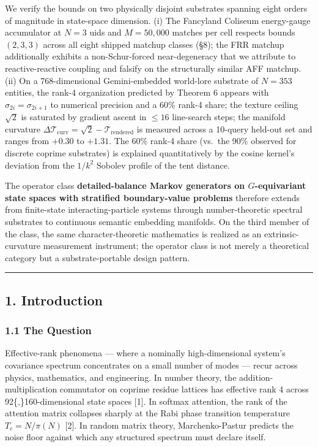 \documentclass[
  11pt,
]{article}
\begin{document}
We verify the bounds on two physically disjoint substrates spanning
eight orders of magnitude in state-space dimension. (i) The Fancyland
Coliseum energy-gauge accumulator at \(N = 3\) uids and \(M = 50{,}000\)
matches per cell respects bounds \((2, 3, 3)\) across all eight shipped
matchup classes (§8); the FRR matchup additionally exhibits a
non-Schur-forced near-degeneracy that we attribute to reactive-reactive
coupling and falsify on the structurally similar AFF matchup. (ii) On a
768-dimensional Gemini-embedded world-lore substrate of \(N = 353\)
entities, the rank-4 organization predicted by Theorem 6 appears with
\(\sigma_{2i} = \sigma_{2i+1}\) to numerical precision and a 60\% rank-4
share; the texture ceiling \(\sqrt{2}\) is saturated by gradient ascent
in \(\leq 16\) line-search steps; the manifold curvature
\(\Delta\mathcal{T}_\text{curv} = \sqrt{2} - \mathcal{T}_\text{rendered}\)
is measured across a 10-query held-out set and ranges from \(+0.30\) to
\(+1.31\). The 60\% rank-4 share (vs.~the 90\% observed for discrete
coprime substrates) is explained quantitatively by the cosine kernel's
deviation from the \(1/k^2\) Sobolev profile of the tent distance.

The operator class \textbf{detailed-balance Markov generators on
\(G\)-equivariant state spaces with stratified boundary-value problems}
therefore extends from finite-state interacting-particle systems through
number-theoretic spectral substrates to continuous semantic embedding
manifolds. On the third member of the class, the same
character-theoretic mathematics is realized as an extrinsic-curvature
measurement instrument; the operator class is not merely a theoretical
category but a substrate-portable design pattern.

\begin{center}\rule{0.5\linewidth}{0.5pt}\end{center}

\subsection{1. Introduction}\label{introduction}

\subsubsection{1.1 The Question}\label{the-question}

Effective-rank phenomena --- where a nominally high-dimensional system's
covariance spectrum concentrates on a small number of modes --- recur
across physics, mathematics, and engineering. In number theory, the
addition-multiplication commutator on coprime residue lattices has
effective rank 4 across 92\{,\}160-dimensional state spaces {[}1{]}. In
softmax attention, the rank of the attention matrix collapses sharply at
the Rabi phase transition temperature \(T_c = N/\pi(N)\) {[}2{]}. In
random matrix theory, Marchenko-Pastur predicts the noise floor against
which any structured spectrum must declare itself.
\end{document}
